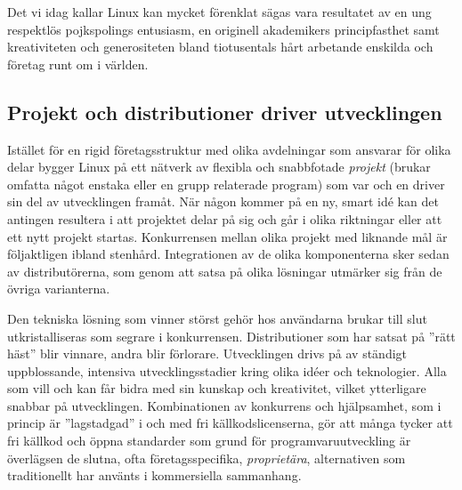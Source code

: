 \documentclass[a4paper,final]{memoir} %
\begin{document}
Det vi idag kallar Linux kan mycket förenklat sägas vara resultatet av en ung respektlös pojkspolings entusiasm, en originell akademikers principfasthet samt kreativiteten och generositeten bland tiotusentals hårt arbetande enskilda och företag runt om i världen.

\subsection{Projekt och distributioner driver utvecklingen}

Istället för en rigid företagsstruktur med olika avdelningar som ansvarar för olika delar bygger Linux på ett nätverk av flexibla och snabbfotade \textit{projekt} (brukar omfatta något enstaka eller en grupp relaterade program) som var och en driver sin del av utvecklingen framåt. När någon kommer på en ny, smart idé kan det antingen resultera i att projektet delar på sig och går i olika riktningar eller att ett nytt projekt startas. Konkurrensen mellan olika projekt med liknande mål är följaktligen ibland stenhård. Integrationen av de olika komponenterna sker sedan av distributörerna, som genom att satsa på olika lösningar utmärker sig från de övriga varianterna.

Den tekniska lösning som vinner störst gehör hos användarna brukar till slut utkristalliseras som segrare i konkurrensen. Distributioner som har satsat på ''rätt häst'' blir vinnare, andra blir förlorare. Utvecklingen drivs på av ständigt uppblossande, intensiva utvecklingsstadier kring olika idéer och teknologier. Alla som vill och kan får bidra med sin kunskap och kreativitet, vilket ytterligare snabbar på utvecklingen. Kombinationen av konkurrens och hjälpsamhet, som i princip är ''lagstadgad'' i och med fri källkodslicenserna, gör att många tycker att fri källkod och öppna standarder som grund för programvaruutveckling är överlägsen de slutna, ofta företagsspecifika, \textit{proprietära}, alternativen som traditionellt har använts i kommersiella sammanhang.


\end{document}
